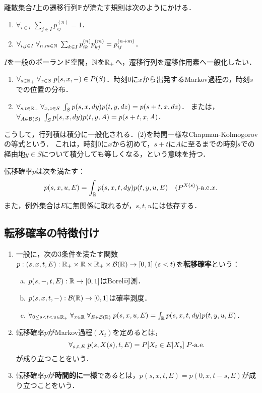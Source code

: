 \documentclass[uplatex,dvipdfmx]{jsreport}
\begin{document}
\begin{discussion}
    離散集合$I$上の遷移行列$\mathbb{P}$が満たす規則は次のようにかける．
    \begin{enumerate}
        \item $\forall_{i\in I}\;\sum_{j\in I}p_{ij}^{(n)}=1$．
        \item $\forall_{i,j\in I}\;\forall_{n,m\in\mathbb{N}}\;\sum_{k\in I}p_{ik}^{(n)}p_{kj}^{(m)}=p_{ij}^{(n+m)}$．
    \end{enumerate}
    $I$を一般のポーランド空間，$\mathbb{N}$を$\mathbb{R}_+$へ，遷移行列を遷移作用素へ一般化したい．
    \begin{enumerate}
        \item $\forall_{s\in\mathbb{R}_+}\;\forall_{x\in S}\;p(s,x,-)\in P(S)$．時刻$0$に$x$から出発するMarkov過程の，時刻$s$での位置の分布．
        \item $\forall_{s,t\in\mathbb{R}_+}\;\forall_{x,z\in S}\;\int_Sp(s,x,dy)p(t,y,dz)=p(s+t,x,dz)$．
        または，$\forall_{A\in\mathcal{B}(S)}\;\int_Sp(s,x,dy)p(t,y,A)=p(s+t,x,A)$．
    \end{enumerate}
    こうして，行列積は積分に一般化される．(2)を時間一様なChapman-Kolmogorovの等式という．
    これは，時刻$0$に$x$から初めて，$s+t$に$A$に至るまでの時刻$s$での経由地$y\in S$について積分しても等しくなる，という意味を持つ．
\end{discussion}

\begin{lemma}
    転移確率$p$は次を満たす：
    \[p(s,x,u,E)=\int_{\mathbb{R}} p(s,x,t,dy)p(t,y,u,E)\quad(P^{X(s)})\text{-a.e.} x.\]
    また，例外集合は$E$に無関係に取れるが，$s,t,u$には依存する．
\end{lemma}

\subsection{転移確率の特徴付け}

\begin{definition}\mbox{}
    \begin{enumerate}
        \item 一般に，次の3条件を満たす関数$p:(s,x,t,E):\mathbb{R}_+\times\mathbb{R}\times\mathbb{R}_+\times\mathcal{B}(\mathbb{R})\to[0,1]\;(s<t)$を\textbf{転移確率}という：
        \begin{enumerate}[(a)]
            \item $p(s,-,t,E):\mathbb{R}\to[0,1]$はBorel可測．
            \item $p(s,x,t,-):\mathcal{B}(\mathbb{R})\to[0,1]$は確率測度．
            \item $\forall_{0\le s<t<u\in\mathbb{R}_+}\;\forall_{x\in\mathbb{R}}\;\forall_{E\in\mathcal{B}(\mathbb{R})}\;p(s,x,u,E)=\int_{\mathbb{R}} p(s,x,t,dy)p(t,y,u,E)$．
        \end{enumerate}
        \item 転移確率$p$がMarkov過程$(X_t)$を定めるとは，
        \[\forall_{s,t,E}\;p(s,X(s),t,E)=P[X_t\in E|X_s]\;P\text{-a.e.}\]
        が成り立つことをいう．
        \item 転移確率$p$が\textbf{時間的に一様}であるとは，$p(s,x,t,E)=p(0,x,t-s,E)$が成り立つことをいう．
    \end{enumerate}
\end{definition}
\end{document}
